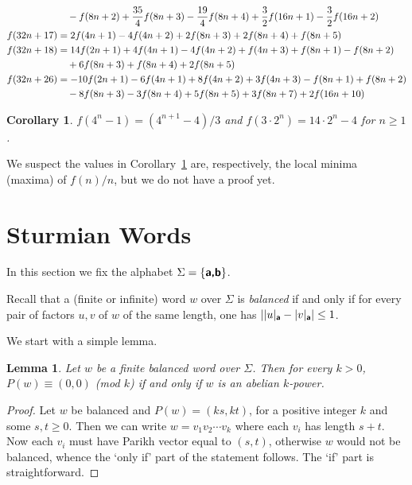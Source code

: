 \documentclass[11pt,reqno]{amsart}
\numberwithin{equation}{section}
\theoremstyle{plain}
\newtheorem{corollary}[theorem]{Corollary}
\newtheorem{lemma}[theorem]{Lemma}
\theoremstyle{definition}
\theoremstyle{remark}
\def\cd3#1{\textbf{\textsf{#1}}}
\def\sa#1{\cd3{#1}}
\begin{document}
\begin{align*}
& \quad -  f(8n+2) +{{35} \over 4}  f(8n+3) -{{19} \over 4}  f(8n+4) +{3 \over 2}  f(16n+1) -{3 \over 2}  f(16n+2) \\
f(32n+17) &= 2  f(4n+1) -4  f(4n+2) + 2  f(8n+3) + 2  f(8n+4) +   f(8n+5) \\
f(32n+18) &= 14  f(2n+1) +4  f(4n+1) -4  f(4n+2) +  f(4n+3) +  f(8n+1) -  f(8n+2) \\
& \quad +6  f(8n+3) +  f(8n+4) +2  f(8n+5) \\
f(32n+26) &= -10  f(2n+1) -6  f(4n+1) +8  f(4n+2) +3  f(4n+3) -  f(8n+1) +  f(8n+2) \\
& \quad -8  f(8n+3) -3  f(8n+4) +5  f(8n+5) +3  f(8n+7) +2  f(16n+10)
\end{align*}

\begin{corollary}
$f(4^n - 1) = (4^{n+1} - 4)/3$ and
$f(3 \cdot 2^n) = 14\cdot 2^n - 4$ for $n \geq 1$. 
\label{cor9}
\end{corollary}

We suspect the values in Corollary~\ref{cor9} are, respectively, the
local minima (maxima) of $f(n)/n$, but we do not have a proof yet.


\section{Sturmian Words}

In this section we fix the alphabet $\Sigma=\{\sa{a,b}\}$.

Recall that a (finite or infinite) word $w$ over $\Sigma$ is
\emph{balanced} if and only if for every pair of
factors $u,v$ of $w$ of the same
length, one has $\left| |u|_{\sa{a}}-|v|_{\sa{a}} \right| \le 1$.

We start with a simple lemma.

\begin{lemma}\label{lem:bal}
 Let $w$ be a finite balanced word over $\Sigma$. Then for every $k>0$,  $P(w) \equiv (0,0)$ (mod $k$) if and only if $w$ is an abelian $k$-power.
\end{lemma}

\begin{proof}
Let $w$ be balanced and $P(w)=(ks,kt)$, for a positive integer $k$ and some  $s,t\geq 0$. Then we can write $w=v_1v_2\cdots v_k$ where each $v_i$ has length $s+t$. Now each $v_i$ must have Parikh vector equal to $(s,t)$, otherwise $w$ would not be balanced, whence the `only if' part of the statement follows. The `if' part is straightforward.
\end{proof}
\end{document}
